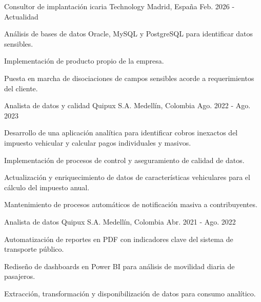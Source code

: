 
\begin{cventries}

\cventry
{Consultor de implantación}
{icaria Technology}
{Madrid, España}
{Feb. 2026 - Actualidad}
{
\begin{cvitems}
\item {Análisis de bases de datos Oracle, MySQL y PostgreSQL para identificar datos sensibles.}
\item {Implementación de producto propio de la empresa.}
\item {Puesta en marcha de disociaciones de campos sensibles acorde a requerimientos del cliente.\hfill \break}
\end{cvitems}
}

\cventry
{Analista de datos y calidad}
{Quipux S.A.}
{Medellín, Colombia}
{Ago. 2022 - Ago. 2023}
{
\begin{cvitems}
\item {Desarrollo de una aplicación analítica para identificar cobros inexactos del impuesto vehicular y calcular pagos individuales y masivos.}
\item {Implementación de procesos de control y aseguramiento de calidad de datos.}
\item {Actualización y enriquecimiento de datos de características vehiculares para el cálculo del impuesto anual.}
\item {Mantenimiento de procesos automáticos de notificación masiva a contribuyentes.\hfill \break}
\end{cvitems}
}

\cventry
{Analista de datos}
{Quipux S.A.}
{Medellín, Colombia}
{Abr. 2021 - Ago. 2022}
{
\begin{cvitems}
\item {Automatización de reportes en PDF con indicadores clave del sistema de transporte público.}
\item {Rediseño de dashboards en Power BI para análisis de movilidad diaria de pasajeros.}
\item {Extracción, transformación y disponibilización de datos para consumo analítico.}
\end{cvitems}
}

\end{cventries}
